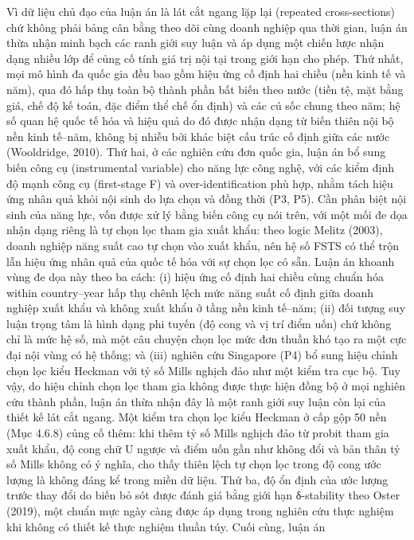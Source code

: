 \documentclass[
  a4paper,
  13pt]{extreport}
\begin{document}
Vì dữ liệu chủ đạo của luận án là lát cắt ngang lặp lại (repeated
cross-sections) chứ không phải bảng cân bằng theo dõi cùng doanh nghiệp
qua thời gian, luận án thừa nhận minh bạch các ranh giới suy luận và áp
dụng một chiến lược nhận dạng nhiều lớp để củng cố tính giá trị nội tại
trong giới hạn cho phép. Thứ nhất, mọi mô hình đa quốc gia đều bao gồm
hiệu ứng cố định hai chiều (nền kinh tế và năm), qua đó hấp thụ toàn bộ
thành phần bất biến theo nước (tiền tệ, mặt bằng giá, chế độ kế toán,
đặc điểm thể chế ổn định) và các cú sốc chung theo năm; hệ số quan hệ
quốc tế hóa và hiệu quả do đó được nhận dạng từ biến thiên nội bộ nền
kinh tế--năm, không bị nhiễu bởi khác biệt cấu trúc cố định giữa các
nước (Wooldridge, 2010). Thứ hai, ở các nghiên cứu đơn quốc gia, luận án
bổ sung biến công cụ (instrumental variable) cho năng lực công nghệ, với
các kiểm định độ mạnh công cụ (first-stage F) và over-identification phù
hợp, nhằm tách hiệu ứng nhân quả khỏi nội sinh do lựa chọn và đồng thời
(P3, P5). Cần phân biệt nội sinh của năng lực, vốn được xử lý bằng biến
công cụ nói trên, với một mối đe dọa nhận dạng riêng là tự chọn lọc tham
gia xuất khẩu: theo logic Melitz (2003), doanh nghiệp năng suất cao tự
chọn vào xuất khẩu, nên hệ số FSTS có thể trộn lẫn hiệu ứng nhân quả của
quốc tế hóa với sự chọn lọc có sẵn. Luận án khoanh vùng đe dọa này theo
ba cách: (i) hiệu ứng cố định hai chiều cùng chuẩn hóa within
country--year hấp thụ chênh lệch mức năng suất cố định giữa doanh nghiệp
xuất khẩu và không xuất khẩu ở tầng nền kinh tế--năm; (ii) đối tượng suy
luận trọng tâm là hình dạng phi tuyến (độ cong và vị trí điểm uốn) chứ
không chỉ là mức hệ số, mà một câu chuyện chọn lọc mức đơn thuần khó tạo
ra một cực đại nội vùng có hệ thống; và (iii) nghiên cứu Singapore (P4)
bổ sung hiệu chỉnh chọn lọc kiểu Heckman với tỷ số Mills nghịch đảo như
một kiểm tra cục bộ. Tuy vậy, do hiệu chỉnh chọn lọc tham gia không được
thực hiện đồng bộ ở mọi nghiên cứu thành phần, luận án thừa nhận đây là
một ranh giới suy luận còn lại của thiết kế lát cắt ngang. Một kiểm tra
chọn lọc kiểu Heckman ở cấp gộp 50 nền (Mục 4.6.8) củng cố thêm: khi
thêm tỷ số Mills nghịch đảo từ probit tham gia xuất khẩu, độ cong chữ U
ngược và điểm uốn gần như không đổi và bản thân tỷ số Mills không có ý
nghĩa, cho thấy thiên lệch tự chọn lọc trong độ cong ước lượng là không
đáng kể trong miền dữ liệu. Thứ ba, độ ổn định của ước lượng trước thay
đổi do biến bỏ sót được đánh giá bằng giới hạn δ-stability theo Oster
(2019), một chuẩn mực ngày càng được áp dụng trong nghiên cứu thực
nghiệm khi không có thiết kế thực nghiệm thuần túy. Cuối cùng, luận án
\end{document}
